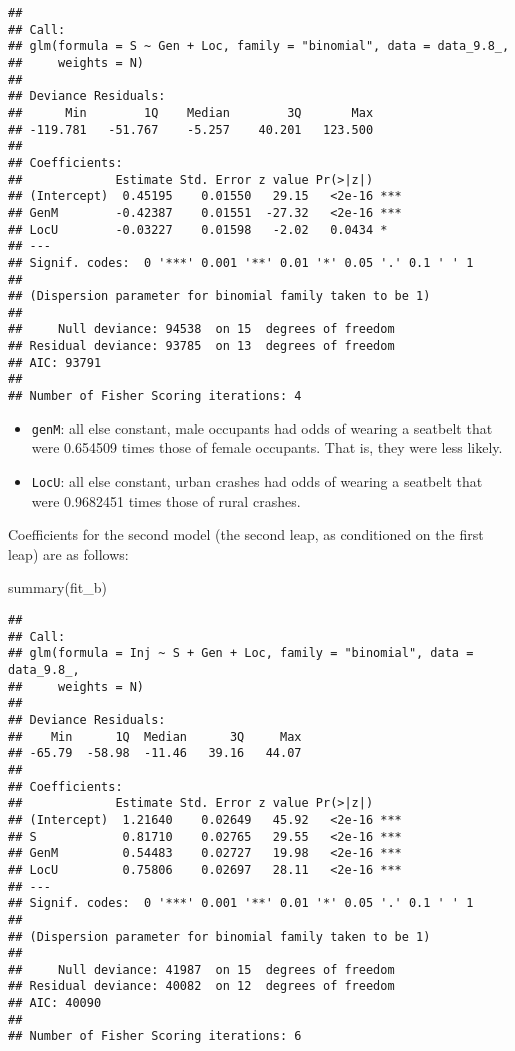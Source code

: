 \documentclass[
]{article}
\newenvironment{Shaded}{\begin{snugshade}}{\end{snugshade}}
\newcommand{\FunctionTok}[1]{\textcolor[rgb]{0.00,0.00,0.00}{#1}}
\newcommand{\NormalTok}[1]{#1}
\begin{document}
\begin{verbatim}
## 
## Call:
## glm(formula = S ~ Gen + Loc, family = "binomial", data = data_9.8_, 
##     weights = N)
## 
## Deviance Residuals: 
##      Min        1Q    Median        3Q       Max  
## -119.781   -51.767    -5.257    40.201   123.500  
## 
## Coefficients:
##             Estimate Std. Error z value Pr(>|z|)    
## (Intercept)  0.45195    0.01550   29.15   <2e-16 ***
## GenM        -0.42387    0.01551  -27.32   <2e-16 ***
## LocU        -0.03227    0.01598   -2.02   0.0434 *  
## ---
## Signif. codes:  0 '***' 0.001 '**' 0.01 '*' 0.05 '.' 0.1 ' ' 1
## 
## (Dispersion parameter for binomial family taken to be 1)
## 
##     Null deviance: 94538  on 15  degrees of freedom
## Residual deviance: 93785  on 13  degrees of freedom
## AIC: 93791
## 
## Number of Fisher Scoring iterations: 4
\end{verbatim}

\begin{itemize}
\item
  \texttt{genM}: all else constant, male occupants had odds of wearing a
  seatbelt that were 0.654509 times those of female occupants. That is,
  they were less likely.
\item
  \texttt{LocU}: all else constant, urban crashes had odds of wearing a
  seatbelt that were 0.9682451 times those of rural crashes.
\end{itemize}

Coefficients for the second model (the second leap, as conditioned on
the first leap) are as follows:

\begin{Shaded}
\begin{Highlighting}[]
\FunctionTok{summary}\NormalTok{(fit\_b)}
\end{Highlighting}
\end{Shaded}

\begin{verbatim}
## 
## Call:
## glm(formula = Inj ~ S + Gen + Loc, family = "binomial", data = data_9.8_, 
##     weights = N)
## 
## Deviance Residuals: 
##    Min      1Q  Median      3Q     Max  
## -65.79  -58.98  -11.46   39.16   44.07  
## 
## Coefficients:
##             Estimate Std. Error z value Pr(>|z|)    
## (Intercept)  1.21640    0.02649   45.92   <2e-16 ***
## S            0.81710    0.02765   29.55   <2e-16 ***
## GenM         0.54483    0.02727   19.98   <2e-16 ***
## LocU         0.75806    0.02697   28.11   <2e-16 ***
## ---
## Signif. codes:  0 '***' 0.001 '**' 0.01 '*' 0.05 '.' 0.1 ' ' 1
## 
## (Dispersion parameter for binomial family taken to be 1)
## 
##     Null deviance: 41987  on 15  degrees of freedom
## Residual deviance: 40082  on 12  degrees of freedom
## AIC: 40090
## 
## Number of Fisher Scoring iterations: 6
\end{verbatim}
\end{document}
